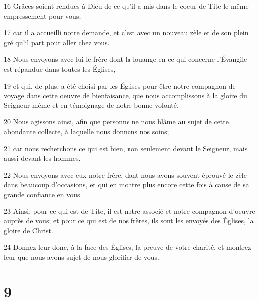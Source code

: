 \par 16 Grâces soient rendues à Dieu de ce qu'il a mis dans le coeur de Tite le même empressement pour vous;
\par 17 car il a accueilli notre demande, et c'est avec un nouveau zèle et de son plein gré qu'il part pour aller chez vous.
\par 18 Nous envoyons avec lui le frère dont la louange en ce qui concerne l'Évangile est répandue dans toutes les Églises,
\par 19 et qui, de plus, a été choisi par les Églises pour être notre compagnon de voyage dans cette oeuvre de bienfaisance, que nous accomplissons à la gloire du Seigneur même et en témoignage de notre bonne volonté.
\par 20 Nous agissons ainsi, afin que personne ne nous blâme au sujet de cette abondante collecte, à laquelle nous donnons nos soins;
\par 21 car nous recherchons ce qui est bien, non seulement devant le Seigneur, mais aussi devant les hommes.
\par 22 Nous envoyons avec eux notre frère, dont nous avons souvent éprouvé le zèle dans beaucoup d'occasions, et qui en montre plus encore cette fois à cause de sa grande confiance en vous.
\par 23 Ainsi, pour ce qui est de Tite, il est notre associé et notre compagnon d'oeuvre auprès de vous; et pour ce qui est de nos frères, ils sont les envoyés des Églises, la gloire de Christ.
\par 24 Donnez-leur donc, à la face des Églises, la preuve de votre charité, et montrez-leur que nous avons sujet de nous glorifier de vous.

\chapter{9}

